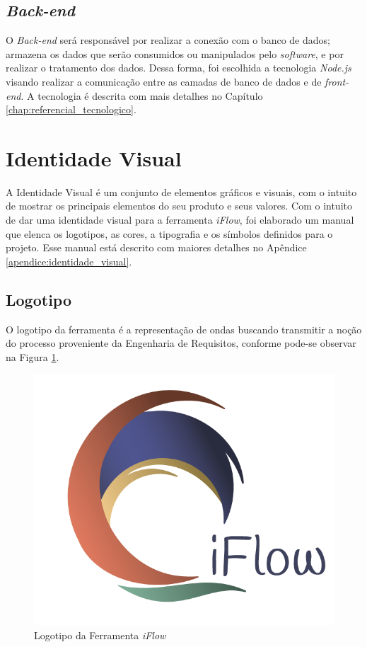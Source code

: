 \subsection{\textit{Back-end}}
O \textit{Back-end} será responsável por realizar a conexão com o banco de dados; armazena os dados que serão consumidos ou manipulados pelo \textit{software}, e por realizar o tratamento dos dados. Dessa forma, foi escolhida a tecnologia \textit{Node.js} visando realizar a comunicação entre as camadas de banco de dados e de \textit{front-end}. A tecnologia é descrita com mais detalhes no Capítulo \ref{chap:referencial_tecnologico}.

\section{Identidade Visual}

\label{sec:identidade_visual}

A Identidade Visual é um conjunto de elementos gráficos e visuais, com o intuito de mostrar os principais elementos do seu produto e seus valores. Com o intuito de dar uma identidade visual para a ferramenta \textit{iFlow}, foi elaborado um manual que elenca os logotipos, as cores, a tipografia e os símbolos definidos para o projeto. Esse manual está descrito com maiores detalhes no Apêndice \ref{apendice:identidade_visual}.

\subsection{Logotipo}
O logotipo da ferramenta é a representação de ondas buscando transmitir a noção do processo proveniente da Engenharia de Requisitos, conforme pode-se observar na Figura \ref{fig:logotipo}.

\begin{figure}[H]
    \begin{center}
        \caption{{Logotipo da Ferramenta \textit{iFlow}}}
        \label{fig:logotipo}
        \includegraphics[scale=1.0]{figuras/Proposta/logotipo.png}
    \end{center}
\end{figure}

